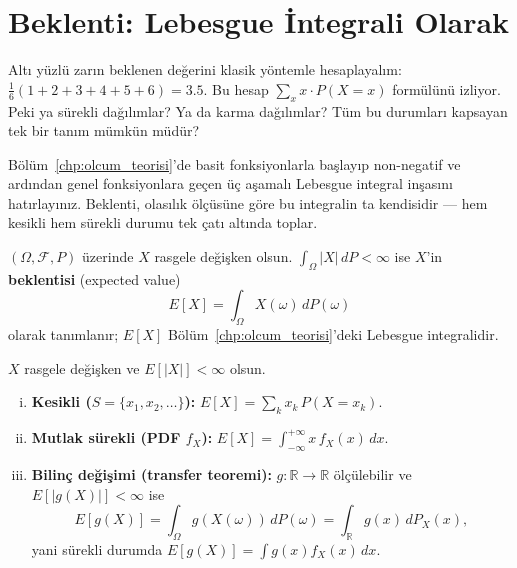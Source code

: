 \section{Beklenti: Lebesgue İntegrali Olarak}
\label{sec:beklenti_tanim}

\begin{kesif}
Altı yüzlü zarın beklenen değerini klasik yöntemle hesaplayalım:
$\frac{1}{6}(1+2+3+4+5+6) = 3.5$.
Bu hesap $\sum_x x \cdot P(X=x)$ formülünü izliyor.
Peki ya sürekli dağılımlar? Ya da karma dağılımlar?
Tüm bu durumları kapsayan tek bir tanım mümkün müdür?
\end{kesif}

\begin{tanimgerekce}
Bölüm~\ref{chp:olcum_teorisi}'de basit fonksiyonlarla başlayıp
non-negatif ve ardından genel fonksiyonlara geçen üç aşamalı Lebesgue
integral inşasını hatırlayınız. Beklenti, olasılık ölçüsüne göre bu
integralin ta kendisidir --- hem kesikli hem sürekli durumu tek çatı altında toplar.
\end{tanimgerekce}

\begin{tanim}[Beklenti]
\label{def:beklenti}
$(\Omega, \mathcal{F}, P)$ üzerinde $X$ rasgele değişken olsun.
$\int_\Omega |X| \, dP < \infty$ ise $X$'in \textbf{beklentisi} (expected value)
\[
  E[X] = \int_\Omega X(\omega) \, dP(\omega)
\]
olarak tanımlanır; $E[X]$ Bölüm~\ref{chp:olcum_teorisi}'deki Lebesgue integralidir.
\end{tanim}

\begin{teorem}
\label{thm:beklenti_formul}
$X$ rasgele değişken ve $E[|X|] < \infty$ olsun.
\begin{enumerate}[(i)]
  \item \textbf{Kesikli ($S = \{x_1, x_2, \ldots\}$):}
        $E[X] = \sum_k x_k \, P(X = x_k)$.
  \item \textbf{Mutlak sürekli (PDF $f_X$):}
        $E[X] = \int_{-\infty}^{+\infty} x \, f_X(x) \, dx$.
  \item \textbf{Bilinç değişimi (transfer teoremi):}
        $g : \mathbb{R} \to \mathbb{R}$ ölçülebilir ve $E[|g(X)|] < \infty$ ise
        \[
          E[g(X)] = \int_\Omega g(X(\omega)) \, dP(\omega) = \int_{\mathbb{R}} g(x) \, dP_X(x),
        \]
        yani sürekli durumda $E[g(X)] = \int g(x) f_X(x) \, dx$.
\end{enumerate}
\end{teorem}

